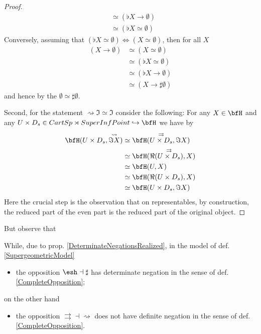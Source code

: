 \begin{proof}
\begin{displaymath}
\begin{aligned}
& \simeq (\flat X \to \emptyset)
\\
& \simeq (\flat X \simeq \emptyset)
\end{aligned}
\end{displaymath}
Conversely, assuming that $(\flat X \simeq \emptyset) \Leftrightarrow (X \simeq \emptyset)$, then for all $X$
\begin{displaymath}
\begin{aligned}
(X\to \emptyset)
& \simeq
(X\simeq \emptyset)
\\
& \simeq (\flat X \simeq \emptyset)
\\
& \simeq (\flat X \to \emptyset)
\\
& \simeq (X\to \sharp \emptyset)
\end{aligned}
\end{displaymath}
and hence by the  $\emptyset \simeq \sharp \emptyset$.

Second, for the statement $\rightsquigarrow \Im \simeq \Im$ consider the following:
For any $X \in \bfH$ and any $U \times D_s\in CartSp \rtimes SuperInfPoint \hookrightarrow \bfH$ we have by  
\begin{displaymath}
\begin{aligned}
\bfH(U \times D_s , \stackrel{\rightsquigarrow}{\Im X})
& \simeq
\bfH(\stackrel{\rightrightarrows}{U \times D_s} , \Im X)
\\
&\simeq
\bfH(\Re(\stackrel{\rightrightarrows}{U \times D_s}) , X)
\\
& \simeq
\bfH(U, X)
\\
& \simeq
\bfH(\Re(U \times D_s), X)
\\
& \simeq \bfH(U \times D_s, \Im X)
\end{aligned}
\end{displaymath}
Here the crucial step is the observation that on representables, by construction, the reduced part of the even part is the reduced part of the original object.
\end{proof}
But observe that
\begin{prop}
\label{CompletenessOfOppositionsInSuperFormalSmoothTypes}\hypertarget{CompletenessOfOppositionsInSuperFormalSmoothTypes}{}
While, due to prop. \ref{DeterminateNegationsRealized}, in the model of def. \ref{SupergeometricModel}
\begin{itemize}%
\item the opposition $\esh  \dashv \sharp$ has determinate negation in the sense of def. \ref{CompleteOpposition};
\end{itemize}
on the other hand
\begin{itemize}%
\item the opposition $\rightrightarrows \dashv \rightsquigarrow$ does not have definite negation in the sense of def. \ref{CompleteOpposition}.
\end{itemize}
\end{prop}
